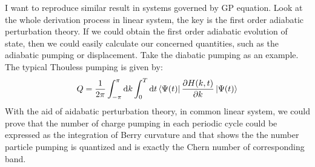 \documentclass[fontsize=11pt, %
                             paper=a4, %
                             twoside, %
                             captions=tableheading,
                             index=totoc,
                             hyperref]{labbook}
\begin{document}
\begin{addmargin}[4cm]{0cm}
I want to reproduce similar result in systems governed by GP equation. Look at the whole derivation process in linear system, the key is the first order adiabatic perturbation theory. If we could obtain the first order adiabatic evolution of state, then we could easily calculate our concerned quantities, such as the adiabatic pumping or displacement.  Take the diabatic pumping as an example. The typical Thouless pumping is given by\cite{PhysRevB.27.6083}:
\begin{equation}
Q=\frac{1}{2\pi}\int_{-\pi}^{\pi}\mathrm{d}k \int_0^T \mathrm{d}t \left< \Psi(t) \right|\frac{\partial H(k,t)}{\partial k}\left| \Psi(t) \right>
\end{equation}
With the aid of aidabatic perturbation theory, in common linear system, we could prove that the number of charge pumping in each periodic cycle could be expressed as the integration of Berry curvature and that shows the the number particle pumping is quantized and is exactly the Chern number of corresponding band.\\


\end{addmargin}
\end{document}
